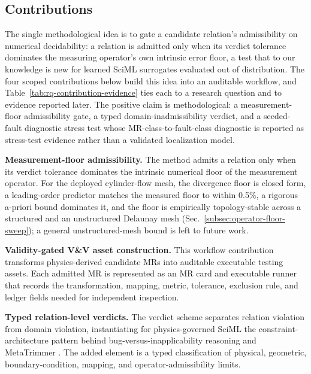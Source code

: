 \documentclass[preprint,12pt]{elsarticle}
\begin{document}
\subsection{Contributions}
\label{subsec:contributions}

The single methodological idea is to gate a candidate relation's admissibility on numerical decidability: a relation is admitted only when its verdict tolerance dominates the measuring operator's own intrinsic error floor, a test that to our knowledge is new for learned SciML surrogates evaluated out of distribution. The four scoped contributions below build this idea into an auditable workflow, and Table~\ref{tab:rq-contribution-evidence} ties each to a research question and to evidence reported later. The positive claim is methodological: a measurement-floor admissibility gate, a typed domain-inadmissibility verdict, and a seeded-fault diagnostic stress test whose MR-class-to-fault-class diagnostic is reported as stress-test evidence rather than a validated localization model.

\textbf{Measurement-floor admissibility.} The method admits a relation only when its verdict tolerance dominates the intrinsic numerical floor of the measurement operator. For the deployed cylinder-flow mesh, the divergence floor is closed form, a leading-order predictor matches the measured floor to within 0.5\%, a rigorous a-priori bound dominates it, and the floor is empirically topology-stable across a structured and an unstructured Delaunay mesh (Sec.~\ref{subsec:operator-floor-sweep}); a general unstructured-mesh bound is left to future work.

\textbf{Validity-gated V\&V asset construction.} This workflow contribution transforms physics-derived candidate MRs into auditable executable testing assets. Each admitted MR is represented as an MR card and executable runner that records the transformation, mapping, metric, tolerance, exclusion rule, and ledger fields needed for independent inspection.

\textbf{Typed relation-level verdicts.} The verdict scheme separates relation violation from domain violation, instantiating for physics-governed SciML the constraint-architecture pattern behind bug-versus-inapplicability reasoning \citep{duqueTorres2023bugornot,duqueTorres2023completePipeline} and MetaTrimmer \citep{duqueTorres2023metaTrimmer}. The added element is a typed classification of physical, geometric, boundary-condition, mapping, and operator-admissibility limits.
\end{document}
